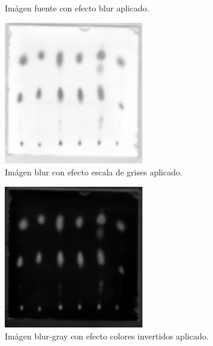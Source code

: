 \begin{itemize}
\begin{figure}[H]
	  \centering
	  \vspace{-0.4cm}
	  \caption{Im\'agen fuente con efecto blur aplicado.}
	  \label{fig:font-blur}
	  \vspace{-0.15cm}
	\end{figure}
	\begin{figure}[H]
	  \vspace{-0.2cm}
	  \centering
	  \includegraphics[width=230px]{imagenes-jtlc/experimento/search-cut-points/2-gray}
	  \centering
	  \vspace{-0.4cm}
	  \caption{Im\'agen blur con efecto escala de grises aplicado.}
	  \label{fig:font-gray}
	  \vspace{-0.15cm}
	\end{figure}
	\begin{figure}[H]
	  \vspace{-0.2cm}
	  \centering
	  \includegraphics[width=230px]{imagenes-jtlc/experimento/search-cut-points/3-invert}
	  \centering
	  \vspace{-0.4cm}
	  \caption{Im\'agen blur-gray con efecto colores invertidos aplicado.}
	  \label{fig:font-invert}
	  \vspace{-0.15cm}
	\end{figure}
	\begin{figure}[H]
	  \vspace{-0.2cm}

\end{figure}
\end{itemize}
